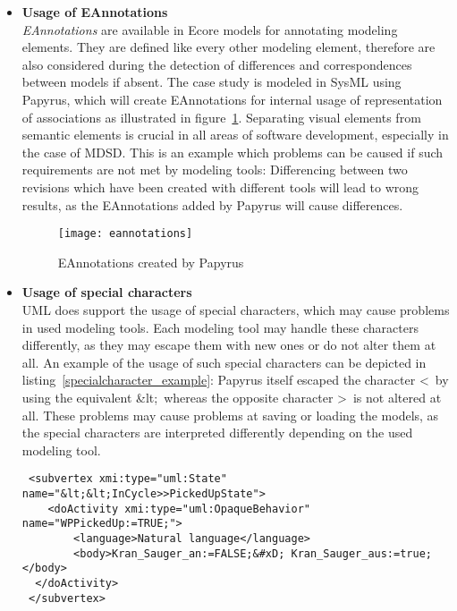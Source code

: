 \begin{itemize}
  \item \textbf{Usage of EAnnotations}\\
  		\textit{EAnnotations} are available in Ecore models for annotating modeling
  		elements. They are defined like every other modeling element, therefore are
  		also considered during the detection of differences and correspondences
  		between models if absent. The case study is modeled in \ac{SysML} using
  		Papyrus\cite{PapyrusURL}, which will create EAnnotations for internal usage
  		of representation of associations as illustrated in
  		figure~\ref{eannotations}. Separating visual elements from semantic elements
  		is crucial in all areas of software development, especially in the case of
  		\ac{MDSD}. This is an example which problems can be caused if such
  		requirements are not met by modeling tools: Differencing between
  		two revisions which have been created with different tools will lead to
  		wrong results, as the EAnnotations added by Papyrus will cause differences.
  		\begin{figure}[h!]
		\begin{center}
		\texttt{[image: eannotations]}\\
		\end{center}
		\caption{EAnnotations created by Papyrus}
		\label{eannotations}
		\end{figure}
		
	\item \textbf{Usage of special characters}\\
		\ac{UML} does support the usage of special characters, which may
		cause problems in used modeling tools. Each modeling tool may handle these
		characters differently, as they may escape them with new ones or do not alter
		them at all. An example of the usage of such special characters can be
		depicted in listing~\ref{specialcharacter_example}: Papyrus itself escaped the
		character \glqq <\grqq\  by using the equivalent \glqq \&lt;\grqq\ whereas
		the opposite character \glqq >\grqq\ is not altered at all. These problems
		may cause problems at saving or loading the models, as the special characters
		are interpreted differently depending on the used modeling tool.
		
		    \begin{lstlisting}
 <subvertex xmi:type="uml:State" name="&lt;&lt;InCycle>>PickedUpState">
 	<doActivity xmi:type="uml:OpaqueBehavior" name="WPPickedUp:=TRUE;"> 
 		<language>Natural language</language>
 		<body>Kran_Sauger_an:=FALSE;&#xD; Kran_Sauger_aus:=true;</body>
  </doActivity>
 </subvertex>\end{lstlisting}
 \end{itemize}
 
